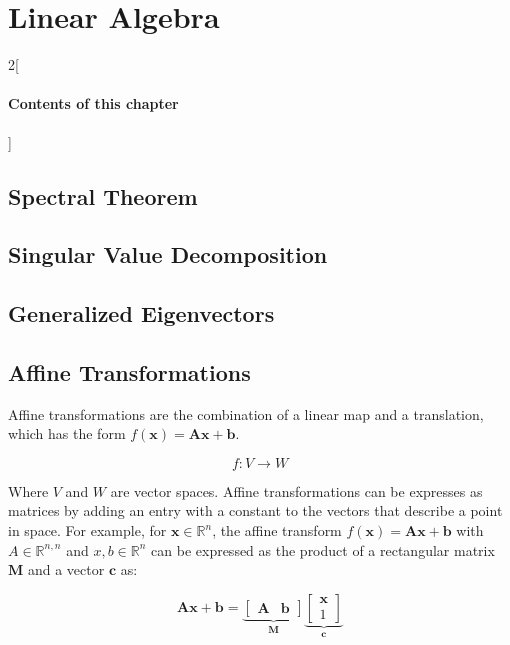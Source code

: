 \chapter{Linear Algebra}

\begin{multicols}{2}[\subsubsection*{Contents of this chapter}]
\end{multicols}

\section{Spectral Theorem}

\section{Singular Value Decomposition}

\section{Generalized Eigenvectors}

\section{Affine Transformations}

Affine transformations are the combination of a linear map and a translation, which has the form $f(\mathbf{x}) = \mathbf{A}\mathbf{x} + \mathbf{b}$. 

\begin{equation}
f: V \rightarrow W
\end{equation}

Where $V$ and $W$ are vector spaces. Affine transformations can be expresses as matrices by adding an entry with a constant to the vectors that describe a point in space. For example, for $\mathbf{x} \in \mathbb{R}^n$,  the affine transform $f(\mathbf{x}) = \mathbf{A}\mathbf{x} + \mathbf{b}$ with $A\in\mathbb{R}^{n,n}$ and $x,b \in \mathbb{R}^{n}$ can be expressed as the product of a rectangular matrix $\mathbf{M}$ and a vector $\mathbf{c}$ as:

\begin{equation}
\mathbf{A}\mathbf{x} + \mathbf{b} = \underbrace{\left[\begin{array}{c|c} \mathbf{A} & \mathbf{b} \end{array}\right]}_{\mathbf{M}} \underbrace{\left[\begin{array}{c} \mathbf{x} \\ 1\end{array} \right]}_{\mathbf{c}}
\end{equation}

